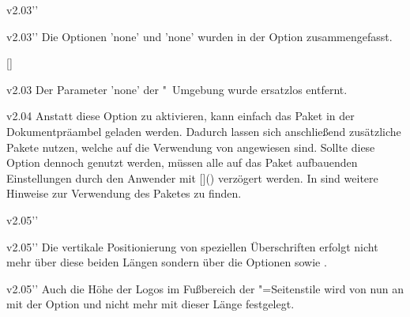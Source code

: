 \begin{Obsolete}{v2.03}{}''
\begin{Obsolete}{v2.03}{}''
\printdeclarationlist%
%
Die Optionen 'none' und 'none' wurden in der 
Option  zusammengefasst.
\end{Obsolete}
\end{Obsolete}

\begin{Declaration'}{[]}
\begin{Obsolete}{v2.03}{}
\printdeclarationlist%
%
Der Parameter 'none' der 
"~Umgebung wurde ersatzlos entfernt.
\end{Obsolete}
\end{Declaration'}


%
\begin{Obsolete}{v2.04}{}%
\printdeclarationlist%
%
Anstatt diese Option zu aktivieren, kann einfach das Paket  
in der Dokumentpräambel geladen werden. Dadurch lassen sich anschließend 
zusätzliche Pakete nutzen, welche auf die Verwendung von  
angewiesen sind. Sollte diese Option dennoch genutzt werden, müssen alle auf 
das Paket  aufbauenden Einstellungen durch den Anwender mit 
[\MPValue{\dots}]() 
verzögert werden. In  sind weitere Hinweise zur Verwendung 
des Paketes  zu finden.
\end{Obsolete}


%
\begin{Obsolete}{v2.05}{}''
\begin{Obsolete}{v2.05}{}''
\printdeclarationlist%
%
Die vertikale Positionierung von speziellen Überschriften erfolgt nicht mehr 
über diese beiden Längen sondern über die Optionen  
sowie .
\end{Obsolete}
\end{Obsolete}


\begin{Obsolete}{v2.05}{}''
\printdeclarationlist%
%
Auch die Höhe der Logos im Fußbereich der "=Seitenstile 
wird von nun an mit der Option  und nicht mehr mit 
dieser Länge festgelegt.
\end{Obsolete}


